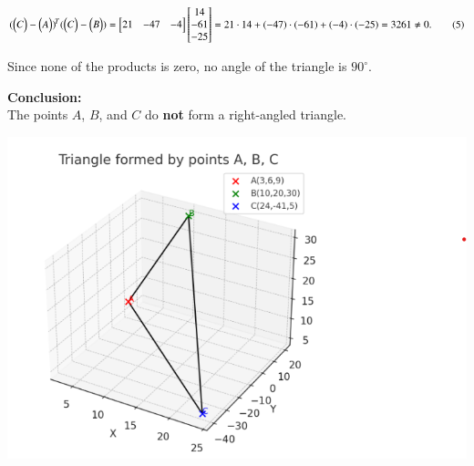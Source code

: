 \documentclass[journal]{IEEEtran}
\begin{document}
\begin{equation}
(\begin{pmatrix}C\end{pmatrix}-\begin{pmatrix}A\end{pmatrix})^{\!T}(\begin{pmatrix}C\end{pmatrix}-\begin{pmatrix}B\end{pmatrix})
=
\begin{bmatrix}21&-47&-4\end{bmatrix}
\begin{bmatrix}14\\-61\\-25\end{bmatrix}
=
21\cdot14+(-47)\cdot(-61)+(-4)\cdot(-25)
=3261 \neq 0.
\tag{5}
\end{equation}

Since none of the products is zero, no angle of the triangle is $90^\circ$.

\bigskip

\textbf{Conclusion:} \\
The points $A$, $B$, and $C$ do \textbf{not} form a right-angled triangle.
\begin{center}
    \includegraphics[width=0.8\columnwidth]{figs/plot3.png}
\end{center}
\end{document}
